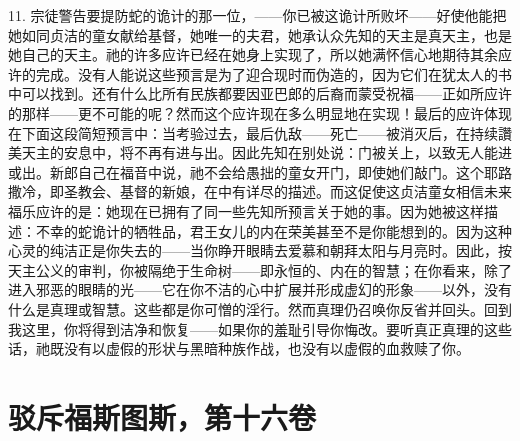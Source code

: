 11. 宗徒警告要提防蛇的诡计的那一位，——你已被这诡计所败坏——好使他能把她如同贞洁的童女献给基督，她唯一的夫君，她承认众先知的天主是真天主，也是她自己的天主。祂的许多应许已经在她身上实现了，所以她满怀信心地期待其余应许的完成。没有人能说这些预言是为了迎合现时而伪造的，因为它们在犹太人的书中可以找到。还有什么比所有民族都要因亚巴郎的后裔而蒙受祝福——正如所应许的那样——更不可能的呢？然而这个应许现在多么明显地在实现！最后的应许体现在下面这段简短预言中：当考验过去，最后仇敌——死亡——被消灭后，在持续讚美天主的安息中，将不再有进与出。因此先知在别处说：门被关上，以致无人能进或出。新郎自己在福音中说，祂不会给愚拙的童女开门，即使她们敲门。这个耶路撒冷，即圣教会、基督的新娘，在中有详尽的描述。而这促使这贞洁童女相信未来福乐应许的是：她现在已拥有了同一些先知所预言关于她的事。因为她被这样描述：不幸的蛇诡计的牺牲品，君王女儿的内在荣美甚至不是你能想到的。因为这种心灵的纯洁正是你失去的——当你睁开眼睛去爱慕和朝拜太阳与月亮时。因此，按天主公义的审判，你被隔绝于生命树——即永恒的、内在的智慧；在你看来，除了进入邪恶的眼睛的光——它在你不洁的心中扩展并形成虚幻的形象——以外，没有什么是真理或智慧。这些都是你可憎的淫行。然而真理仍召唤你反省并回头。回到我这里，你将得到洁净和恢复——如果你的羞耻引导你悔改。要听真正真理的这些话，祂既没有以虚假的形状与黑暗种族作战，也没有以虚假的血救赎了你。\par



\section{驳斥福斯图斯，第十六卷}

\par

